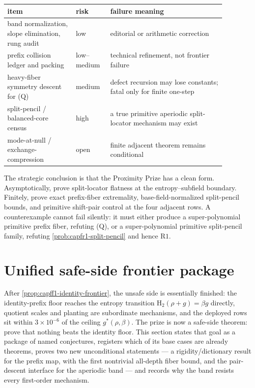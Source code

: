 \documentclass[11pt]{article}
\theoremstyle{definition}
\theoremstyle{remark}
\newcommand{\Hb}{\mathrm{H}_2}
\providecommand{\Rone}{\mathrm{R1}}
\begin{document}
\begin{center}
\small
\begin{tabular}{|p{0.28\linewidth}|p{0.13\linewidth}|p{0.47\linewidth}|}
\hline
item & risk & failure meaning\\
\hline
band normalization, slope elimination, rung audit & low & editorial or arithmetic correction\\
\hline
prefix collision ledger and packing & low--medium & technical refinement, not frontier failure\\
\hline
heavy-fiber symmetry descent for \textup{(Q)} & medium & defect recursion may lose constants; fatal only for finite one-step\\
\hline
split-pencil / balanced-core census & high & a true primitive aperiodic split-locator mechanism may exist\\
\hline
mode-at-null / exchange-compression & open & finite adjacent theorem remains conditional\\
\hline
\end{tabular}
\end{center}

The strategic conclusion is that the Proximity Prize has a clean form.  Asymptotically, prove split-locator flatness at the entropy--subfield boundary.  Finitely, prove exact prefix-fiber extremality, base-field-normalized split-pencil bounds, and primitive shift-pair control at the four adjacent rows.  A counterexample cannot fail silently: it must either produce a super-polynomial primitive prefix fiber, refuting \textup{(Q)}, or a super-polynomial primitive split-pencil family, refuting \cref{prob:capfr1-split-pencil} and hence \(\Rone\).


\section{Unified safe-side frontier package}\label{sec:capfp-prize}

After \cref{prop:capff1-identity-frontier}, the unsafe side is essentially finished: the identity-prefix floor reaches the entropy transition $\Hb(\rho+g)=\beta g$ directly, quotient scales and planting are subordinate mechanisms, and the deployed rows sit within $3\times10^{-6}$ of the ceiling $g^*(\rho,\beta)$.  The prize is now a safe-side theorem: prove that nothing beats the identity floor.  This section states that goal as a package of named conjectures, registers which of its base cases are already theorems, proves two new unconditional statements --- a rigidity/dictionary result for the prefix map, with the first nontrivial all-depth fiber bound, and the pair-descent interface for the aperiodic band --- and records why the band resists every first-order mechanism.
\end{document}
